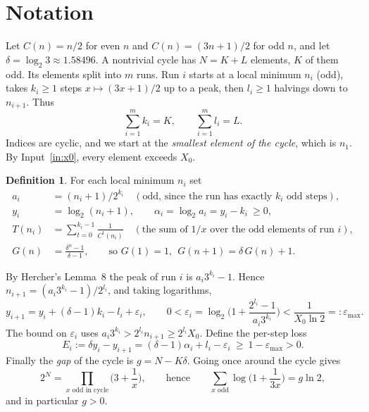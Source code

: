 \documentclass[11pt]{amsart}
\theoremstyle{definition}
\newtheorem{definition}[theorem]{Definition}
\theoremstyle{remark}
\newcommand{\epsmax}{\varepsilon_{\max}}
\begin{document}
\section{Notation}\label{sec:notation}

Let $C(n) = n/2$ for even $n$ and $C(n) = (3n+1)/2$ for odd $n$, and let
$\delta = \log_2 3 \approx 1.58496$. A nontrivial cycle has $N = K + L$ elements, $K$ of
them odd. Its elements split into $m$ runs. Run $i$ starts at a local minimum $n_i$ (odd),
takes $k_i \ge 1$ steps $x \mapsto (3x+1)/2$ up to a peak, then $l_i \ge 1$ halvings
down to $n_{i+1}$. Thus
\[
  \sum_{i=1}^{m} k_i = K, \qquad \sum_{i=1}^{m} l_i = L .
\]
Indices are cyclic, and we start at the \emph{smallest element of the cycle}, which is $n_1$.
By Input~\ref{in:x0}, every element exceeds $X_0$.

\begin{definition}
For each local minimum $n_i$ set
\begin{align*}
  a_i &= (n_i+1)/2^{k_i} \quad (\text{odd, since the run has exactly } k_i \text{ odd steps}),\\
  y_i &= \log_2(n_i+1), \qquad \alpha_i = \log_2 a_i = y_i - k_i \ \ge 0,\\
  T(n_i) &= \sum_{t=0}^{k_i-1} \frac{1}{C^{t}(n_i)} \quad (\text{the sum of } 1/x \text{ over the odd elements of run } i),\\
  G(n) &= \frac{\delta^{n}-1}{\delta-1}, \qquad\text{so } G(1)=1,\ \ G(n+1) = \delta\, G(n) + 1 .
\end{align*}
\end{definition}

By Hercher's Lemma~8 the peak of run $i$ is $a_i 3^{k_i} - 1$. Hence
$n_{i+1} = (a_i 3^{k_i} - 1)/2^{l_i}$, and taking logarithms,
\begin{equation}\label{eq:step}
  y_{i+1} = y_i + (\delta-1)k_i - l_i + \varepsilon_i,
  \qquad
  0 < \varepsilon_i = \log_2\!\Big(1 + \frac{2^{l_i}-1}{a_i 3^{k_i}}\Big) < \frac{1}{X_0 \ln 2} =: \epsmax .
\end{equation}
The bound on $\varepsilon_i$ uses $a_i 3^{k_i} > 2^{l_i} n_{i+1} \ge 2^{l_i} X_0$. Define the per-step loss
\begin{equation}\label{eq:E}
  E_i := \delta y_i - y_{i+1} = (\delta-1)\alpha_i + l_i - \varepsilon_i \ \ge\ 1 - \epsmax > 0 .
\end{equation}
Finally the \emph{gap} of the cycle is $g = N - K\delta$. Going once around the cycle gives
\begin{equation}\label{eq:product}
  2^{N} = \prod_{x \text{ odd in cycle}} \Big(3 + \frac{1}{x}\Big),
  \qquad\text{hence}\qquad
  \sum_{x \text{ odd}} \log\!\Big(1+\frac{1}{3x}\Big) = g \ln 2,
\end{equation}
and in particular $g > 0$.
\end{document}

